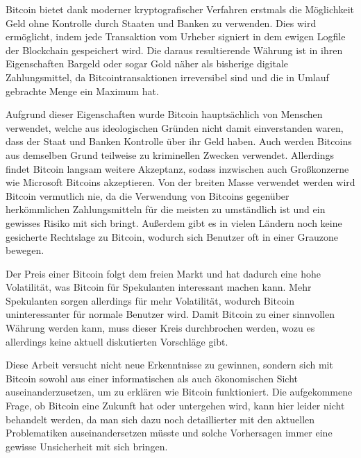 Bitcoin bietet dank moderner kryptografischer Verfahren erstmals die Möglichkeit Geld ohne Kontrolle durch Staaten und Banken zu verwenden.
Dies wird ermöglicht, indem jede Transaktion vom Urheber signiert in dem ewigen Logfile der Blockchain gespeichert wird.
Die daraus resultierende Währung ist in ihren Eigenschaften Bargeld oder sogar Gold näher als bisherige digitale Zahlungsmittel, da Bitcointransaktionen irreversibel sind und die in Umlauf gebrachte Menge ein Maximum hat.

Aufgrund dieser Eigenschaften wurde Bitcoin hauptsächlich von Menschen verwendet, welche aus ideologischen Gründen nicht damit einverstanden waren, dass der Staat und Banken Kontrolle über ihr Geld haben.
Auch werden Bitcoins aus demselben Grund teilweise zu kriminellen Zwecken verwendet.
Allerdings findet Bitcoin langsam weitere Akzeptanz, sodass inzwischen auch Großkonzerne wie Microsoft Bitcoins akzeptieren.
Von der breiten Masse verwendet werden wird Bitcoin vermutlich nie, da die Verwendung von Bitcoins gegenüber herkömmlichen Zahlungsmitteln für die meisten zu umständlich ist und ein gewisses Risiko mit sich bringt.
Außerdem gibt es in vielen Ländern noch keine gesicherte Rechtslage zu Bitcoin, wodurch sich Benutzer oft in einer Grauzone bewegen.

Der Preis einer Bitcoin folgt dem freien Markt und hat dadurch eine hohe Volatilität, was Bitcoin für Spekulanten interessant machen kann.
Mehr Spekulanten sorgen allerdings für mehr Volatilität, wodurch Bitcoin uninteressanter für normale Benutzer wird.
Damit Bitcoin zu einer sinnvollen Währung werden kann, muss dieser Kreis durchbrochen werden, wozu es allerdings keine aktuell diskutierten Vorschläge gibt.

Diese Arbeit versucht nicht neue Erkenntnisse zu gewinnen, sondern sich mit Bitcoin sowohl aus einer informatischen als auch ökonomischen Sicht auseinanderzusetzen, um zu erklären wie Bitcoin funktioniert.
Die aufgekommene Frage, ob Bitcoin eine Zukunft hat oder untergehen wird, kann hier leider nicht behandelt werden, da man sich dazu noch detaillierter mit den aktuellen Problematiken auseinandersetzen müsste und solche Vorhersagen immer eine gewisse Unsicherheit mit sich bringen.
